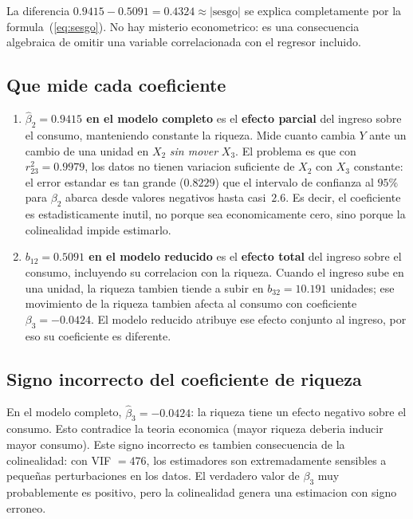\documentclass[12pt, letterpaper]{article}
\theoremstyle{remark}
\begin{document}
La diferencia $0.9415 - 0.5091 = 0.4324 \approx |\text{sesgo}|$ se explica
completamente por la formula~(\ref{eq:sesgo}). No hay misterio econometrico:
es una consecuencia algebraica de omitir una variable correlacionada con el
regresor incluido.

\subsection{Que mide cada coeficiente}

\begin{enumerate}[leftmargin=1.8em, itemsep=6pt]
  \item \textbf{$\hat\beta_2 = 0.9415$ en el modelo completo} es el
    \textbf{efecto parcial} del ingreso sobre el consumo, manteniendo constante
    la riqueza. Mide cuanto cambia $Y$ ante un cambio de una unidad en $X_2$
    \emph{sin mover} $X_3$. El problema es que con $r_{23}^2 = 0.9979$, los
    datos no tienen variacion suficiente de $X_2$ con $X_3$ constante:
    el error estandar es tan grande ($0.8229$) que el intervalo de confianza
    al $95\%$ para $\beta_2$ abarca desde valores negativos hasta casi~$2.6$.
    Es decir, el coeficiente es estadisticamente inutil, no porque sea economicamente
    cero, sino porque la colinealidad impide estimarlo.

  \item \textbf{$b_{12} = 0.5091$ en el modelo reducido} es el
    \textbf{efecto total} del ingreso sobre el consumo, incluyendo su correlacion
    con la riqueza. Cuando el ingreso sube en una unidad, la riqueza tambien
    tiende a subir en $b_{32} = 10.191$ unidades; ese movimiento de la riqueza
    tambien afecta al consumo con coeficiente $\beta_3 = -0.0424$. El modelo
    reducido atribuye ese efecto conjunto al ingreso, por eso su coeficiente
    es diferente.
\end{enumerate}

\subsection{Signo incorrecto del coeficiente de riqueza}

En el modelo completo, $\hat\beta_3 = -0.0424$: la riqueza tiene un efecto
negativo sobre el consumo. Esto contradice la teoria economica (mayor riqueza
deberia inducir mayor consumo). Este signo incorrecto es tambien consecuencia
de la colinealidad: con VIF $= 476$, los estimadores son extremadamente sensibles
a pequeñas perturbaciones en los datos. El verdadero valor de $\beta_3$ muy
probablemente es positivo, pero la colinealidad genera una estimacion con signo
erroneo.
\end{document}
